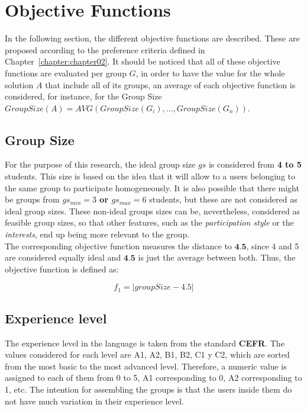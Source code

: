 \section{Objective Functions} \label{sec:objective_functions}

In the following section, the different objective functions are described. These are proposed according to the preference criteria defined in Chapter~\ref{chapter:chapter02}. It should be noticed that all of these objective functions are evaluated per group $G$, in order to have the value for the whole solution $A$ that include all of its groups, an average of each objective function is considered, for instance, for the Group Size $GroupSize(A) = AVG(GroupSize(G_i),...,GroupSize(G_n))$.\\

\subsection{Group Size}

For the purpose of this research, the ideal group size $gs$ is considered from \textbf{4 to 5} students. This size is based on the idea that it will allow to a users belonging to the same group to participate homogeneously. It is also possible that there might be groups from  \textbf{$gs_{min} = 3$ or $gs_{max} = 6$} students, but these are not considered as ideal group sizes. These non-ideal groups sizes can be,  nevertheless, considered as feasible group sizes, so that other features, such as the \textit{participation style} or the \textit{interests}, end up being more relevant to the group.\\

The corresponding objective function measures the distance to $\textbf{4.5}$, since 4 and 5 are considered equally ideal and $\textbf{4.5}$ is just the average between both. Thus, the objective function is defined as:

\begin{equation} \label{eq_group_size}
    f_1 = | groupSize - 4.5|
\end{equation}

\subsection{Experience level}

The experience level in the language is taken from the standard \textbf{CEFR}. The values considered for each level are A1, A2, B1, B2, C1 y C2, which are sorted from the most basic to the most advanced level. Therefore, a numeric value is assigned to each of them from 0 to 5, A1 corresponding to 0, A2 corresponding to 1, etc. The intention for assembling the groups is that the users inside them do not have much variation in their experience level.\\

